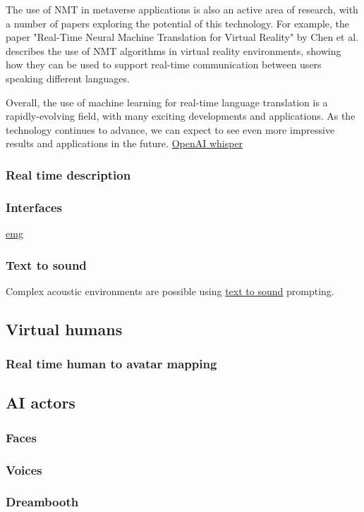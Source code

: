 The use of NMT in metaverse applications is also an active area of research, with a number of papers exploring the potential of this technology. For example, the paper "Real-Time Neural Machine Translation for Virtual Reality" by Chen et al. describes the use of NMT algorithms in virtual reality environments, showing how they can be used to support real-time communication between users speaking different languages.\par
Overall, the use of machine learning for real-time language translation is a rapidly-evolving field, with many exciting developments and applications. As the technology continues to advance, we can expect to see even more impressive results and applications in the future.
\href{https://openai.com/blog/whisper/}{OpenAI whisper}
\subsubsection{Real time description}
\subsubsection{Interfaces}
\href{https://tech.fb.com/ar-vr/2021/03/inside-facebook-reality-labs-wrist-based-interaction-for-the-next-computing-platform/}{emg}
\subsubsection{Text to sound}
Complex acoustic environments are possible using \href{https://anonymous.4open.science/w/iclr2023_samples-CB68/report.html}{text to sound} prompting. 
\subsection{Virtual humans}
\subsubsection{Real time human to avatar mapping}
\subsection{AI actors}
\subsubsection{Faces}
\subsubsection{Voices}
\subsubsection{Dreambooth}
